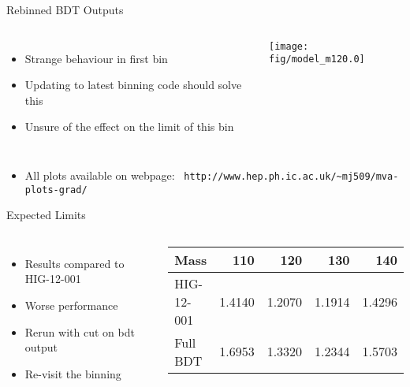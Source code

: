 \documentclass[t, 8pt]{beamer}
\begin{document}
\begin{frame}[fragile]{Rebinned BDT Outputs}
  \begin{columns}[c]
  \begin{itemize}
    \item Strange behaviour in first bin
    \item Updating to latest binning code should solve this
    \item Unsure of the effect on the limit of this bin
  \end{itemize}
    \texttt{[image: fig/model\_m120.0]}
  \end{columns}
  \begin{itemize}
    \item All plots available on webpage:~ \tiny{\verb=http://www.hep.ph.ic.ac.uk/~mj509/mva-plots-grad/=}
  \end{itemize}
\end{frame}

\begin{frame}{Expected Limits}
  \vspace{1cm}
  \begin{columns}[c]
  \begin{itemize}
    \item Results compared to HIG-12-001
    \item Worse performance
    \item Rerun with cut on bdt output
    \item Re-visit the binning
  \end{itemize}
\begin{center}

\begin{table}[htbp]
\begin{tabular}{|l|r r r r |}
\hline
Mass       & 110    & 120    & 130    & 140    \\ \hline
HIG-12-001 & 1.4140 & 1.2070 & 1.1914 & 1.4296 \\
Full BDT   & 1.6953 & 1.3320 & 1.2344 & 1.5703 \\ \hline
\end{tabular}
\end{table}
\end{center}
\end{columns}
\end{frame}
\end{document}

